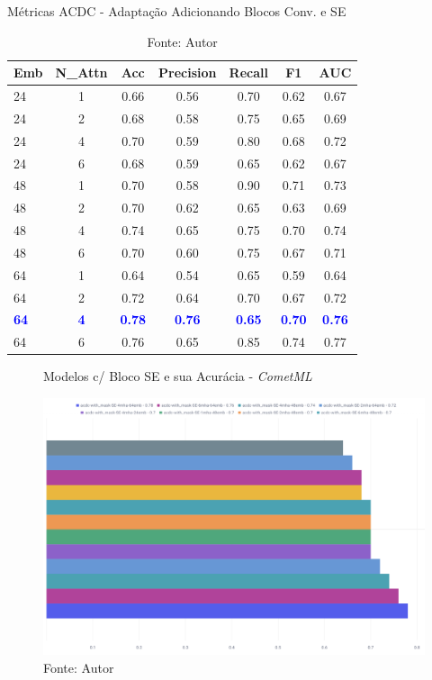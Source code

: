 \begin{table}[htbp]
\centering
\caption{Métricas ACDC - Adaptação Adicionando Blocos Conv. e SE}
\begin{tabular}{lcccccc}
\toprule
\textbf{Emb} & \textbf{N\_Attn} & \textbf{Acc} & \textbf{Precision} & \textbf{Recall} & \textbf{F1} & \textbf{AUC} \\
\midrule
24 & 1 & 0.66 & 0.56 & 0.70 & 0.62 & 0.67 \\
24 & 2 & 0.68 & 0.58 & 0.75 & 0.65 & 0.69 \\
24 & 4 & 0.70 & 0.59 & 0.80 & 0.68 & 0.72 \\
24 & 6 & 0.68 & 0.59 & 0.65 & 0.62 & 0.67 \\
\hline
48 & 1 & 0.70 & 0.58 & 0.90 & 0.71 & 0.73 \\
48 & 2 & 0.70 & 0.62 & 0.65 & 0.63 & 0.69 \\
48 & 4 & 0.74 & 0.65 & 0.75 & 0.70 & 0.74 \\
48 & 6 & 0.70 & 0.60 & 0.75 & 0.67 & 0.71 \\
\hline
64 & 1 & 0.64 & 0.54 & 0.65 & 0.59 & 0.64 \\
64 & 2 & 0.72 & 0.64 & 0.70 & 0.67 & 0.72 \\
\textcolor{blue}{\textbf{64}} & \textcolor{blue}{\textbf{4}} & \textcolor{blue}{\textbf{0.78}} & \textcolor{blue}{\textbf{0.76}} & \textcolor{blue}{\textbf{0.65}} & \textcolor{blue}{\textbf{0.70}} & \textcolor{blue}{\textbf{0.76}} \\
64 & 6 & 0.76 & 0.65 & 0.85 & 0.74 & 0.77 \\
\bottomrule
\end{tabular}
\caption*{Fonte: Autor}
\label{tab:metrics_acdc_se}
\end{table}


\begin{figure}[h!]
    \centering
    \caption{Modelos c/ Bloco SE e sua Acurácia - \textit{CometML}}
    \includegraphics[width=1\textwidth]{figures/fig032.png}
    \caption*{Fonte: Autor}
    \label{fig:fig032}
\end{figure}

